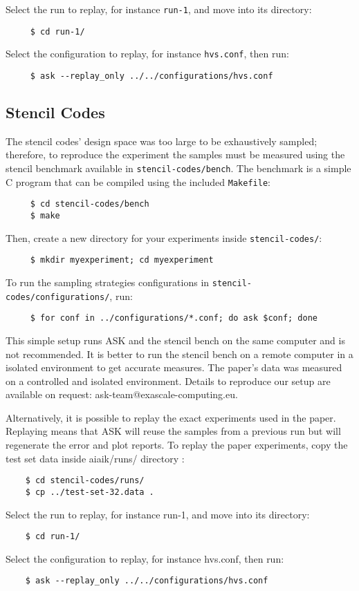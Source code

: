 Select the run to replay, for instance \texttt{run-1}, and move into its directory:
\begin{verbatim}
	 $ cd run-1/
\end{verbatim}

Select the configuration to replay, for instance \texttt{hvs.conf}, then run:
\begin{verbatim}
	 $ ask --replay_only ../../configurations/hvs.conf
\end{verbatim}

\subsection{Stencil Codes}

The stencil codes' design space was too large to be exhaustively sampled; therefore, to reproduce the experiment
the samples must be measured using the stencil benchmark available in \texttt{stencil-codes/bench}.
The benchmark is a simple C program that can be compiled using the included \texttt{Makefile}:
\begin{verbatim}
	 $ cd stencil-codes/bench
	 $ make
\end{verbatim}

Then, create a new directory for your experiments inside \texttt{stencil-codes/}:
\begin{verbatim}
	 $ mkdir myexperiment; cd myexperiment
\end{verbatim}

To run the sampling strategies configurations in \texttt{stencil-codes/configurations/}, run:
\begin{verbatim}
	 $ for conf in ../configurations/*.conf; do ask $conf; done
\end{verbatim}

This simple setup runs ASK and the stencil bench on the same computer and is not recommended. It is better to run the stencil bench on a remote computer in a isolated environment to get accurate measures. The paper's data was measured on a controlled and isolated environment. Details to reproduce our setup are available on request: ask-team@exascale-computing.eu.

Alternatively, it is possible to replay the exact experiments used in the paper. Replaying means that ASK will reuse the samples from a previous run but will regenerate the error and plot reports. 
To replay the paper experiments, copy the test set data inside aiaik/runs/ directory :
\begin{verbatim}
	$ cd stencil-codes/runs/
	$ cp ../test-set-32.data .
\end{verbatim}
Select the run to replay, for instance run-1, and move into its directory:
\begin{verbatim}
	$ cd run-1/
\end{verbatim}
Select the configuration to replay, for instance hvs.conf, then run:
\begin{verbatim}
	$ ask --replay_only ../../configurations/hvs.conf
\end{verbatim}
